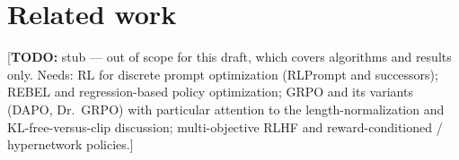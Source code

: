 \documentclass[11pt]{article}
\theoremstyle{plain}
\newcommand{\todo}[1]{\textcolor{red!70!black}{[\textbf{TODO:} #1]}}
\begin{document}








\section{Related work}
\todo{stub --- out of scope for this draft, which covers algorithms and results
only. Needs: RL for discrete prompt optimization (RLPrompt and successors);
REBEL and regression-based policy optimization; GRPO and its variants (DAPO,
Dr.\ GRPO) with particular attention to the length-normalization and
KL-free-versus-clip discussion; multi-objective RLHF and reward-conditioned /
hypernetwork policies.}





\end{document}
